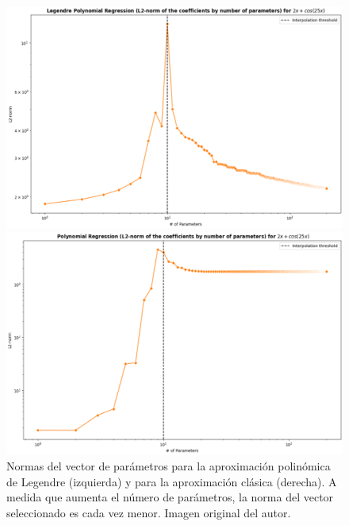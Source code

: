 \begin{figure}[htbp]
    \centering
    \begin{minipage}{0.4\textwidth}
        \centering
        \includegraphics[width=\linewidth]{img/experiments/legendre1.4.png}
    \end{minipage}
    \hfill
    \begin{minipage}{0.4\textwidth}
        \centering
        \includegraphics[width=\linewidth]{img/experiments/OLS1.4.png}
    \end{minipage}
    \caption[Normas del vector de parámetros para las aproximaciones polinómicas.]{Normas del vector de parámetros para la aproximación polinómica de Legendre (izquierda) y para la aproximación clásica (derecha). A medida que aumenta el número de parámetros, la norma del vector seleccionado es cada vez menor. Imagen original del autor.}\label{fig:legendreandclassicDD}
\end{figure}

